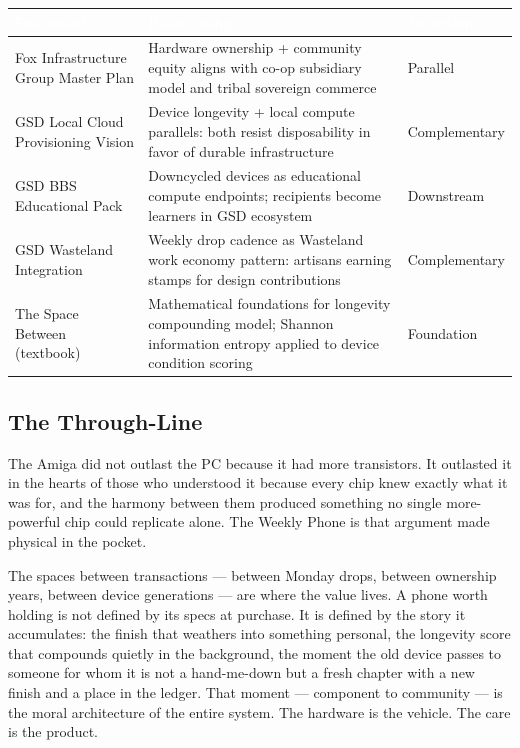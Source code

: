 \documentclass[11pt,letterpaper]{article}
\newcommand{\tableheader}[1]{\textbf{\sffamily\textcolor{white}{#1}}}
\begin{document}
\begin{center}
\begin{tabularx}{\textwidth}{L{4cm}XC{2.5cm}}
\toprule
{}
\tableheader{Document} & \tableheader{Relationship} & \tableheader{Direction} \\
\midrule
Fox Infrastructure Group Master Plan & Hardware ownership + community equity aligns with co-op subsidiary model and tribal sovereign commerce & Parallel \\
GSD Local Cloud Provisioning Vision & Device longevity + local compute parallels: both resist disposability in favor of durable infrastructure & Complementary \\
GSD BBS Educational Pack & Downcycled devices as educational compute endpoints; recipients become learners in GSD ecosystem & Downstream \\
GSD Wasteland Integration & Weekly drop cadence as Wasteland work economy pattern: artisans earning stamps for design contributions & Complementary \\
The Space Between (textbook) & Mathematical foundations for longevity compounding model; Shannon information entropy applied to device condition scoring & Foundation \\
\bottomrule
\end{tabularx}
\end{center}

\subsection{The Through-Line}

The Amiga did not outlast the PC because it had more transistors. It outlasted it in the hearts of those who understood it because every chip knew exactly what it was for, and the harmony between them produced something no single more-powerful chip could replicate alone. The Weekly Phone is that argument made physical in the pocket.

The spaces between transactions --- between Monday drops, between ownership years, between device generations --- are where the value lives. A phone worth holding is not defined by its specs at purchase. It is defined by the story it accumulates: the finish that weathers into something personal, the longevity score that compounds quietly in the background, the moment the old device passes to someone for whom it is not a hand-me-down but a fresh chapter with a new finish and a place in the ledger. That moment --- component to community --- is the moral architecture of the entire system. The hardware is the vehicle. The care is the product.
\end{document}
